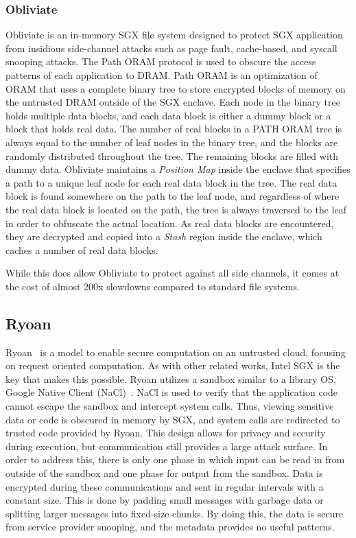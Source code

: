 \documentclass[letterpaper,twocolumn,10pt]{article}
\begin{document}
\subsubsection{Obliviate}
Obliviate is an in-memory SGX file system designed to protect SGX application
from insidious side-channel attacks such as page fault, cache-based, and
syscall snooping attacks. The Path ORAM protocol is used to obscure the access
patterns of each application to DRAM. Path ORAM is an optimization of ORAM
that uses a complete binary tree to store encrypted blocks of memory on the
untrusted DRAM outside of the SGX enclave. Each node in the binary tree holds
multiple data blocks, and each data block is either a dummy block or a block that
holds real data. The number of real blocks in a PATH ORAM tree is always equal
to the number of leaf nodes in the binary tree, and the blocks are randomly
distributed throughout the tree. The remaining blocks are filled with dummy
data. Obliviate maintains a \emph{Position Map} inside the enclave that
specifies a path to a unique leaf node for each real data block in the tree.
The real data block is found somewhere on the path to the leaf node, and
regardless of where the real data block is located on the path, the tree is
always traversed to the leaf in order to obfuscate the actual location.  As
real data blocks are encountered, they are decrypted and copied into a
\emph{Stash} region inside the enclave, which caches a number of real data
blocks.

While this does allow Obliviate to protect against all side channels, it comes
at the cost of almost 200x slowdowns compared to standard file systems.


\subsection{Ryoan}
Ryoan~\cite{hunt_ryoan:_2016} is a model to enable secure computation on an untrusted cloud,
focusing on request oriented computation. As with other related works, Intel
SGX is the key that makes this possible. Ryoan utilizes a sandbox similar to a
library OS, Google Native Client (NaCl)~\cite{yee_native_2009}. NaCl is used to verify that the
application code cannot escape the sandbox and intercept system calls.  Thus,
viewing sensitive data or code is obscured in memory by SGX, and system calls
are redirected to trusted code provided by Ryoan. This design allows for
privacy and security during execution, but communication still provides a large
attack surface.  In order to address this, there is only one phase in which
input can be read in from outside of the sandbox and one phase for output from
the sandbox. Data is encrypted during these communications and sent in regular
intervals with a constant size.  This is done by padding small messages with
garbage data or splitting larger messages into fixed-size chunks. By doing
this, the data is secure from service provider snooping, and the metadata
provides no useful patterns.
\end{document}
